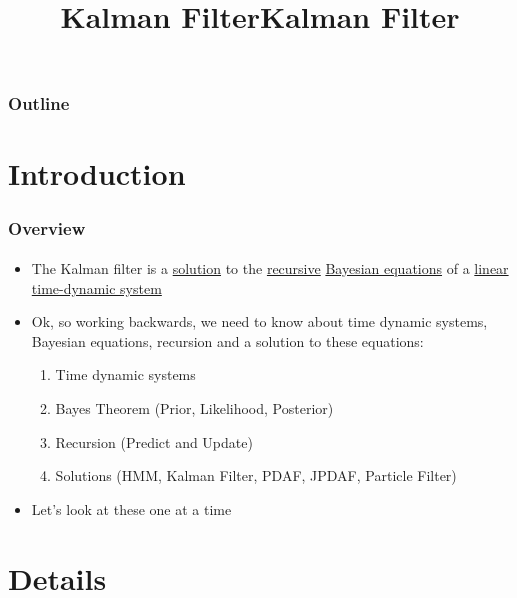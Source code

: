 \documentclass{beamer}
\title{Kalman Filter}
\begin{document}
\begin{frame}[plain]
\title{Kalman Filter}
\titlepage
\end{frame}



\begin{frame}
\frametitle{Outline}
\setcounter{tocdepth}{2}	
\tableofcontents
\end{frame}




\section{Introduction}
\begin{frame}
\frametitle{Overview}
\framesubtitle{}
\mypagenum
\begin{itemize}
\item The Kalman filter is a \underline{solution} to the \underline{recursive} \underline{Bayesian equations} of a \underline{linear time-dynamic system}
\item Ok, so working backwards, we need to know about time dynamic systems, Bayesian equations, recursion and a solution to these equations:
\begin{enumerate}
\item Time dynamic systems
\item Bayes Theorem (Prior, Likelihood, Posterior)
\item Recursion (Predict and Update)
\item Solutions (HMM, Kalman Filter, PDAF, JPDAF, Particle Filter)
\end{enumerate}
\item Let's look at these one at a time
\end{itemize}
\end{frame}





\section{Details}
\end{document}
